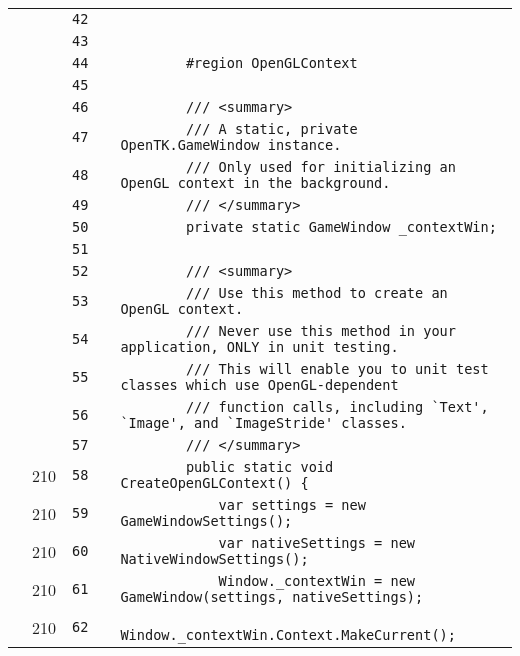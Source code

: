 \documentclass[a4paper,landscape,10pt]{article}
\begin{document}
\begin{longtable}[l]{lrrll}
\cellcolor{gray} &  & \verb~42~ & & \verb~~\\
\cellcolor{gray} &  & \verb~43~ & & \verb~~\\
\cellcolor{gray} &  & \verb~44~ & & \verb~        #region OpenGLContext~\\
\cellcolor{gray} &  & \verb~45~ & & \verb~~\\
\cellcolor{gray} &  & \verb~46~ & & \verb~        /// <summary>~\\
\cellcolor{gray} &  & \verb~47~ & & \verb~        /// A static, private OpenTK.GameWindow instance.~\\
\cellcolor{gray} &  & \verb~48~ & & \verb~        /// Only used for initializing an OpenGL context in the background.~\\
\cellcolor{gray} &  & \verb~49~ & & \verb~        /// </summary>~\\
\cellcolor{gray} &  & \verb~50~ & & \verb~        private static GameWindow _contextWin;~\\
\cellcolor{gray} &  & \verb~51~ & & \verb~~\\
\cellcolor{gray} &  & \verb~52~ & & \verb~        /// <summary>~\\
\cellcolor{gray} &  & \verb~53~ & & \verb~        /// Use this method to create an OpenGL context.~\\
\cellcolor{gray} &  & \verb~54~ & & \verb~        /// Never use this method in your application, ONLY in unit testing.~\\
\cellcolor{gray} &  & \verb~55~ & & \verb~        /// This will enable you to unit test classes which use OpenGL-dependent~\\
\cellcolor{gray} &  & \verb~56~ & & \verb~        /// function calls, including `Text', `Image', and `ImageStride' classes.~\\
\cellcolor{gray} &  & \verb~57~ & & \verb~        /// </summary>~\\
\cellcolor{green} & 210 & \verb~58~ & & \verb~        public static void CreateOpenGLContext() {~\\
\cellcolor{green} & 210 & \verb~59~ & & \verb~            var settings = new GameWindowSettings();~\\
\cellcolor{green} & 210 & \verb~60~ & & \verb~            var nativeSettings = new NativeWindowSettings();~\\
\cellcolor{green} & 210 & \verb~61~ & & \verb~            Window._contextWin = new GameWindow(settings, nativeSettings);~\\
\cellcolor{green} & 210 & \verb~62~ & & \verb~            Window._contextWin.Context.MakeCurrent();~\\

\end{longtable}
\end{document}
